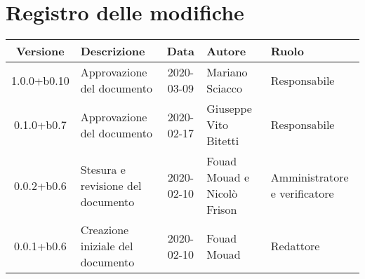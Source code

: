 \section*{Registro delle modifiche}

\begin{center}
	\begin{longtable}{|c|p{3.5cm}|c|p{3cm}|p{3cm}|}
	\hline
	\rowcolor{lighter-grayer}
	\textbf{Versione} & \textbf{Descrizione} & \textbf{Data} & \textbf{Autore} & \textbf{Ruolo} \\
	\hline
	\endfirsthead

	1.0.0+b0.10 & Approvazione del documento & 2020-03-09 & Mariano Sciacco & Responsabile \\
	\hline
	0.1.0+b0.7 & Approvazione del documento & 2020-02-17 & Giuseppe Vito Bitetti & Responsabile \\
	\hline
	0.0.2+b0.6 & Stesura e revisione del documento & 2020-02-10 & Fouad Mouad e Nicolò Frison & Amministratore e verificatore \\
	\hline
	0.0.1+b0.6 & Creazione iniziale del documento & 2020-02-10 & Fouad Mouad & Redattore \\
	\hline

	\end{longtable}
\end{center}